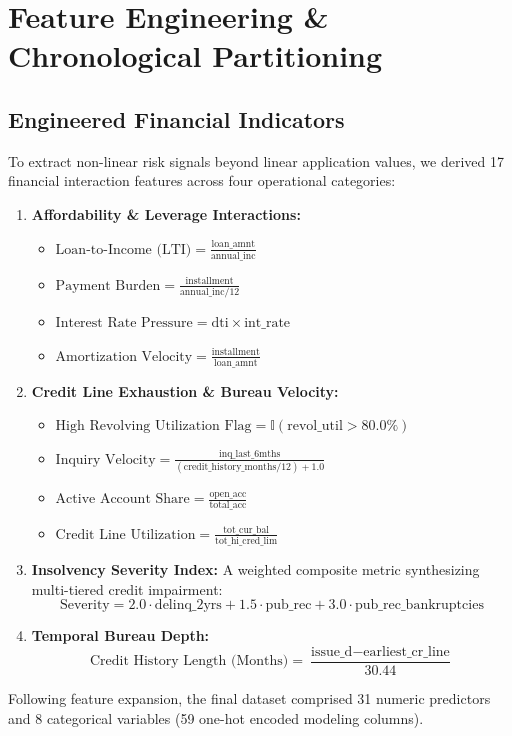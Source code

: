 \documentclass[conference]{IEEEtran}
\begin{document}
\section{Feature Engineering \& Chronological Partitioning}

\subsection{Engineered Financial Indicators}
To extract non-linear risk signals beyond linear application values, we derived 17 financial interaction features across four operational categories:
\begin{enumerate}
    \item \textbf{Affordability \& Leverage Interactions:}
    \begin{itemize}
        \item $\text{Loan-to-Income (LTI)} = \frac{\text{loan\_amnt}}{\text{annual\_inc}}$
        \item $\text{Payment Burden} = \frac{\text{installment}}{\text{annual\_inc} / 12}$
        \item $\text{Interest Rate Pressure} = \text{dti} \times \text{int\_rate}$
        \item $\text{Amortization Velocity} = \frac{\text{installment}}{\text{loan\_amnt}}$
    \end{itemize}
    \item \textbf{Credit Line Exhaustion \& Bureau Velocity:}
    \begin{itemize}
        \item $\text{High Revolving Utilization Flag} = \mathbb{I}(\text{revol\_util} > 80.0\%)$
        \item $\text{Inquiry Velocity} = \frac{\text{inq\_last\_6mths}}{(\text{credit\_history\_months} / 12) + 1.0}$
        \item $\text{Active Account Share} = \frac{\text{open\_acc}}{\text{total\_acc}}$
        \item $\text{Credit Line Utilization} = \frac{\text{tot\_cur\_bal}}{\text{tot\_hi\_cred\_lim}}$
    \end{itemize}
    \item \textbf{Insolvency Severity Index:} A weighted composite metric synthesizing multi-tiered credit impairment:
    \begin{equation}
    \text{Severity} = 2.0 \cdot \text{delinq\_2yrs} + 1.5 \cdot \text{pub\_rec} + 3.0 \cdot \text{pub\_rec\_bankruptcies}
    \end{equation}
    \item \textbf{Temporal Bureau Depth:}
    \begin{equation}
    \text{Credit History Length (Months)} = \frac{\text{issue\_d} - \text{earliest\_cr\_line}}{30.44}
    \end{equation}
\end{enumerate}
Following feature expansion, the final dataset comprised 31 numeric predictors and 8 categorical variables (59 one-hot encoded modeling columns).
\end{document}
